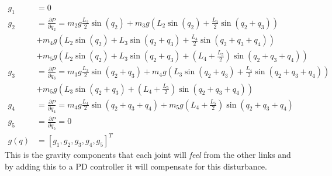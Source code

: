  \begin{align*}
    g_1 &= 0
    \\
    g_2 &= \frac{\partial P}{\partial q_2} = 
    m_2g\frac{L_2}{2}\sin{(q_2)}+
    m_3g\left( L_2 \sin{(q_2)} + \frac{L_3}{2}\sin{(q_2+q_3)} \right)\\&+
    m_4g\left( L_2 \sin{(q_2)} + L_3\sin{(q_2 + q_3)} + \frac{L_4}{2}\sin{(q_2+q_3+q_4)} \right)\\&+
    m_5g\left( L_2 \sin{(q_2)} + L_3\sin{(q_2 + q_3)} + \left(L_4 + \frac{L_5}{2} \right)\sin{(q_2+q_3+q_4)} \right)
    \\
    g_3 &= \frac{\partial P}{\partial q_3} =
    m_3g\frac{L_3}{2}\sin{(q_2+q_3)} +
    m_4g\left( L_3\sin{(q_2 + q_3)} + \frac{L_4}{2}\sin{(q_2+q_3+q_4)} \right)\\&+
    m_5g\left(  L_3\sin{(q_2 + q_3)} + \left(L_4 + \frac{L_5}{2} \right)\sin{(q_2+q_3+q_4)} \right)
    \\
    g_4 &=\frac{\partial P}{\partial q_4} = 
    m_4g\frac{L_4}{2}\sin{(q_2+q_3+q_4)}+
    m_5g\left(L_4 + \frac{L_5}{2} \right)\sin{(q_2+q_3+q_4)}
    \\
    g_5 &= \frac{\partial P}{\partial q_5} = 0
    \\
    g(q) &= [g_1,g_2,g_3,g_4,g_5]^T
 \end{align*}
This is the gravity components that each joint will \textit{feel} from the other links and by adding this to a PD controller it will compensate for this disturbance. 

